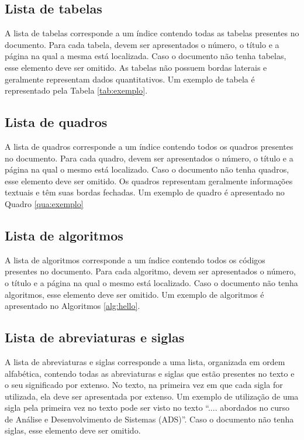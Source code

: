 \subsection{Lista de tabelas}

A lista de tabelas corresponde a um índice contendo todas as tabelas presentes no documento. Para cada tabela, devem ser apresentados o número, o título e a página na qual a mesma está localizada. Caso o documento não tenha tabelas, esse elemento deve ser omitido. As tabelas não possuem bordas laterais e geralmente representam dados quantitativos. Um exemplo de tabela é representado pela Tabela \ref{tab:exemplo}.



\subsection{Lista de quadros}

A lista de quadros corresponde a um índice contendo todos os quadros presentes no documento. Para cada quadro, devem ser apresentados o número, o título e a página na qual o mesmo está localizado. Caso o documento não tenha quadros, esse elemento deve ser omitido. Os quadros representam geralmente informações textuais e têm suas bordas fechadas. Um exemplo de quadro é apresentado no Quadro \ref{qua:exemplo}



\subsection{Lista de algoritmos}

A lista de algoritmos corresponde a um índice contendo todos os códigos presentes no documento. Para cada algoritmo, devem ser apresentados o número, o título e a página na qual o mesmo está localizado. Caso o documento não tenha algoritmos, esse elemento deve ser omitido. Um exemplo de algoritmos é apresentado no Algoritmos \ref{alg:hello}.



\subsection{Lista de abreviaturas e siglas}

A lista de abreviaturas e siglas corresponde a uma lista, organizada em ordem alfabética, contendo todas as abreviaturas e siglas que estão presentes no texto e o seu significado por extenso. No texto, na primeira vez em que cada sigla for utilizada, ela deve ser apresentada por extenso. Um exemplo de utilização de uma sigla pela primeira vez no texto pode ser visto no texto “.... abordados no curso de  Análise e Desenvolvimento de Sistemas (ADS)”. Caso o documento não tenha siglas, esse elemento deve ser omitido.

